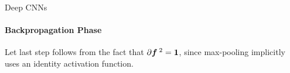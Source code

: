 \begin{frame}{Deep CNNs}
\framesubtitle{Backpropagation Phase}
Let last step follows from the fact that $\partial {\boldsymbol f}^{\;2} = \mathbf{1}$, since
max-pooling implicitly uses an identity activation function.
%
%
%
%
%

\end{frame}
